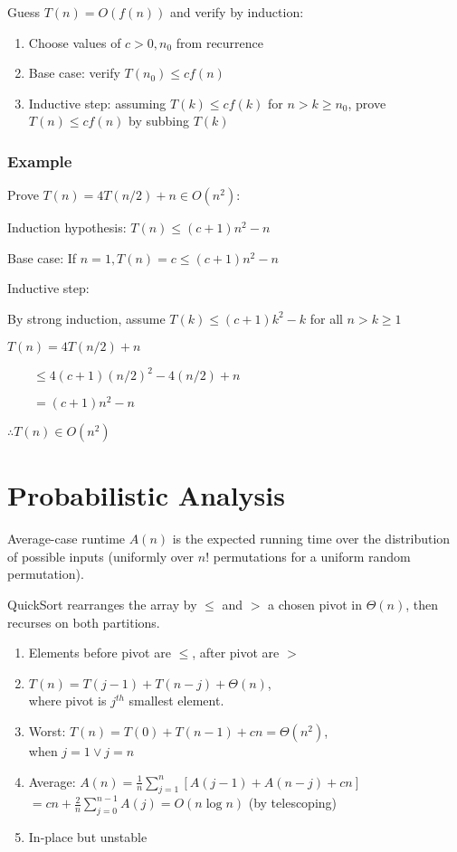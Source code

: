 \documentclass[12pt, a4paper]{article}
\begin{document}
\begin{multicols*}{3}
Guess $T(n) = O(f(n))$ and verify by induction:
\begin{enumerate}[\roman*.]
  \item Choose values of $c > 0, n_0$ from recurrence
  \item Base case: verify $T(n_0) \leq cf(n)$
  \item Inductive step: assuming $T(k) \leq cf(k)$ for $n > k \geq n_0$, prove $T(n) \leq cf(n)$ by subbing $T(k)$
\end{enumerate}

\subsubsection{Example}

Prove $T(n) = 4T(n /2) + n \in O(n^2)$:\\
\begin{enumproof}
\item Induction hypothesis: $T(n) \leq (c+1)n^2-n$
\item Base case: If $n = 1, T(n) = c \leq (c+1)n^2-n$
\item Inductive step: 
  \begin{enumproof}
  \item By strong induction, assume $T(k) \leq (c+1)k^2-k$ for all $n > k \geq 1$
  \item $T(n) = 4T(n /2) + n$
  \item $\quad\quad \leq 4(c+1)(n /2)^2 - 4(n /2) + n$
  \item $\quad\quad = (c+1)n^2-n$
  \end{enumproof}
\item $\therefore T(n) \in O(n^2)$
\end{enumproof}

\colbreak
\section{Probabilistic Analysis}
Average-case runtime $A(n)$ is the expected running time over the distribution of possible inputs (uniformly over $n!$ permutations for a uniform random permutation).

QuickSort rearranges the array by $\leq$ and $>$ a chosen pivot in $\Theta(n)$, then recurses on both partitions.
\begin{enumerate}[\roman*.]
  \item Elements before pivot are $\leq$, after pivot are $>$
  \item $T(n) = T(j-1)+T(n-j)+\Theta(n)$,\\ where pivot is $j^{th}$ smallest element.
  \item Worst: $T(n) = T(0) + T(n-1) + cn = \Theta(n^2)$,\\ when $j=1 \lor j=n$ 
  \item Average: $A(n) = \frac{1}{n} \sum^n_{j=1}[A(j-1)+A(n-j)+cn]$\\$= cn + \frac{2}{n}\sum^{n-1}_{j=0}A(j) = O(n\log n)$ (by telescoping)
  \item In-place but unstable
\end{enumerate}


\end{multicols*}
\end{document}
